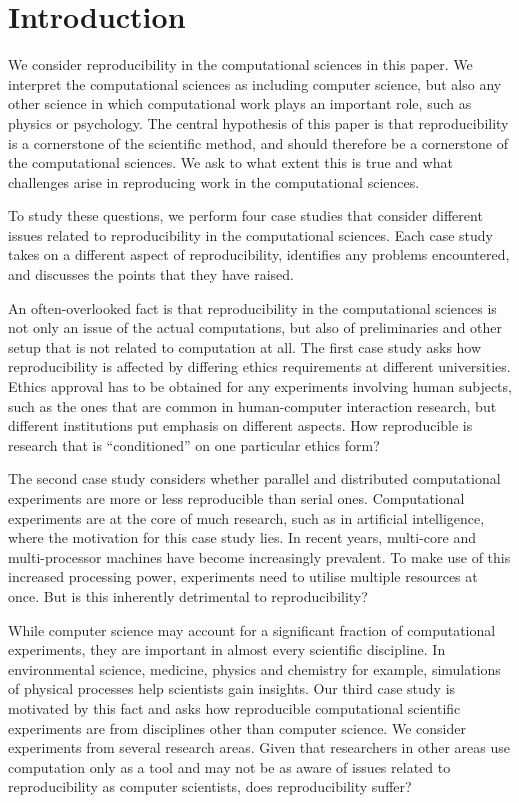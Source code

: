 \section{Introduction}
\label{s:intro}


We consider reproducibility in the computational sciences in this paper.  We
interpret the computational sciences as including computer science, but also any
other science in which computational work plays an important role, such as
physics or psychology. The central hypothesis of this paper is that
reproducibility is a cornerstone of the scientific method, and should therefore
be a cornerstone of the computational sciences. We ask to what extent this is true
and what challenges arise in reproducing work in the computational sciences.

To study these questions, we perform four case studies that consider different
issues related to reproducibility in the computational sciences.  Each case study
takes on a different aspect of reproducibility, identifies any problems
encountered, and discusses the points that they have raised.

An often-overlooked fact is that reproducibility in the computational sciences
is not only an issue of the actual computations, but also of preliminaries and
other setup that is not related to computation at all. The first case study asks
how reproducibility is affected by differing ethics requirements at different
universities. Ethics approval has to be obtained for any experiments involving
human subjects, such as the ones that are common in human-computer interaction
research, but different institutions put emphasis on different aspects. How
reproducible is research that is ``conditioned'' on one particular ethics form?

The second case study considers whether parallel and distributed computational
experiments are more or less reproducible than serial ones. Computational
experiments are at the core of much research, such as in artificial
intelligence, where the motivation for this case study lies. In recent years,
multi-core and multi-processor machines have become increasingly prevalent. To
make use of this increased processing power, experiments need to utilise
multiple resources at once. But is this inherently detrimental to
reproducibility?

While computer science may account for a significant fraction of computational
experiments, they are important in almost every scientific discipline. In environmental science, 
medicine, physics and chemistry for example, simulations of physical processes help scientists gain
insights. Our third case study is motivated by this fact and asks how
reproducible computational scientific experiments are from disciplines other than
computer science. We consider experiments from several research areas. Given
that researchers in other areas use computation only as a tool and may not be
as aware of issues related to reproducibility as computer scientists, does
reproducibility suffer?

